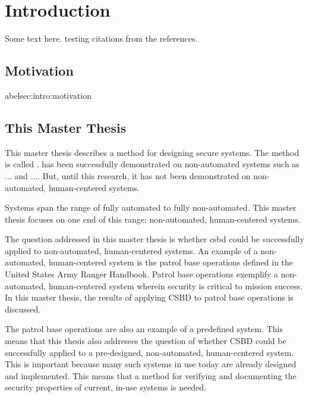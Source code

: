 \documentclass[../../main/main.tex]{subfiles}
\begin{document}
\glsresetall

\chapter{Introduction}
Some text here.\cite{ChinOlder} testing citations from the references.

\section{Motivation}\;abel{sec:intro:motivation}
\section{This Master Thesis}\label{sec:thismasterthesis}
\glsresetall

This master thesis describes a method for designing secure systems.  The method is called  .   has been successfully demonstrated on non-automated systems such as ... and ....  But, until this research, it has not been demonstrated on non-automated, human-centered systems.  

Systems span the range of fully automated to fully non-automated.  This master thesis focuses on one end of this range: non-automated, human-centered systems.




The question addressed in this master thesis is whether \gls{csbd} could be successfully applied to non-automated, human-centered systems.  An example of a non-automated, human-centered system is the patrol base operations defined in the United States Army Ranger Handbook\cite{rangermanual}.   Patrol base operations exemplify a non-automated, human-centered system wherein security is critical to mission success.  In this master thesis, the results of applying CSBD to patrol base operations is discussed. 


The patrol base operations are also an example of a predefined system.  This means that this thesis also addresses the question of whether CSBD could be successfully applied to a pre-designed, non-automated, human-centered system.  This is important because many such systems in use today are already designed and implemented.  This means that a method for verifying and documenting the security properties of current, in-use systems is needed.  
\end{document}
